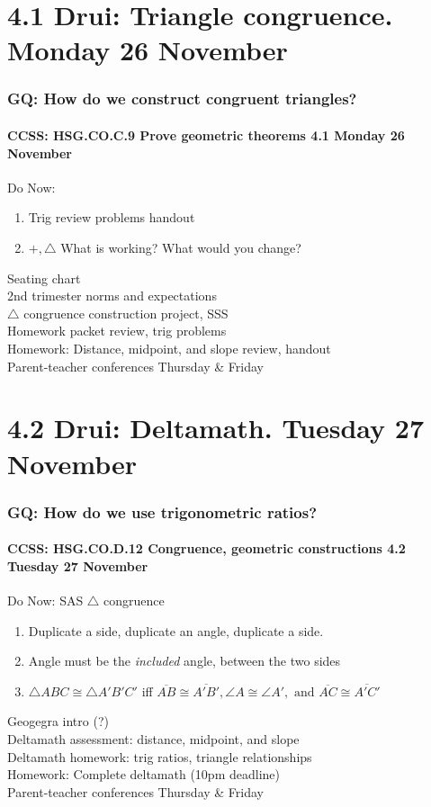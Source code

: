 \documentclass{beamer}
\begin{document}
\section{4.1 Drui: Triangle congruence. Monday 26 November}
  \frame
  {
    \frametitle{GQ: How do we construct congruent triangles?}
    \framesubtitle{CCSS: HSG.CO.C.9 Prove geometric theorems  \alert{4.1 Monday 26 November}}

    \begin{block}{Do Now: }
      \begin{enumerate}
        \item Trig review problems handout
        \item $+, \triangle$ What is working? What would you change?
      \end{enumerate}
    \end{block}
    Seating chart \\
    2nd trimester norms and expectations \\
    $\triangle$ congruence construction project, SSS\\
    Homework packet review, trig problems \\[0.5cm]
    Homework: Distance, midpoint, and slope review, handout\\
    \alert{Parent-teacher conferences Thursday \& Friday}
  }


\section{4.2 Drui: Deltamath. Tuesday 27 November}
  \frame
  {
    \frametitle{GQ: How do we use trigonometric ratios?}
    \framesubtitle{CCSS: HSG.CO.D.12 Congruence, geometric constructions  \alert{4.2 Tuesday 27 November}}

    \begin{block}{Do Now: SAS $\triangle$ congruence}
    \begin{enumerate}
        \item Duplicate a side, duplicate an angle, duplicate a side.
        \item Angle must be the \emph{included} angle, between the two sides
        \item $\triangle ABC \cong \triangle A'B'C'$ iff $\overline{AB} \cong \overline{A'B'}, \angle A \cong \angle A', \text{ and } \overline{AC} \cong \overline{A'C'}$
    \end{enumerate}
    \end{block}
    Geogegra intro (?)\\
    Deltamath assessment: distance, midpoint, and slope\\
    Deltamath homework: trig ratios, triangle relationships\\[0.5cm]
    Homework: Complete deltamath (10pm deadline)\\
    \alert{Parent-teacher conferences Thursday \& Friday}
  }
\end{document}
